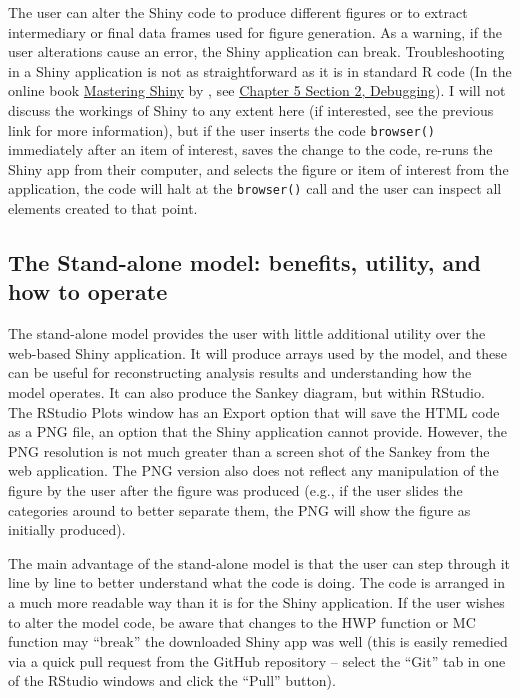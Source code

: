 \documentclass[
]{book}
\begin{document}
The user can alter the Shiny code to produce different figures or to extract intermediary or final data frames used for figure generation. As a warning, if the user alterations cause an error, the Shiny application can break. Troubleshooting in a Shiny application is not as straightforward as it is in standard R code (In the online book \href{https://mastering-shiny.org/index.html}{Mastering Shiny} by \citet{wickham2021}, see \href{https://mastering-shiny.org/action-workflow.html}{Chapter 5 Section 2, Debugging}). I will not discuss the workings of Shiny to any extent here (if interested, see the previous link for more information), but if the user inserts the code \texttt{browser()} immediately after an item of interest, saves the change to the code, re-runs the Shiny app from their computer, and selects the figure or item of interest from the application, the code will halt at the \texttt{browser()} call and the user can inspect all elements created to that point.

\hypertarget{run-opp-sa}{%
\subsection{The Stand-alone model: benefits, utility, and how to operate}\label{run-opp-sa}}

The stand-alone model provides the user with little additional utility over the web-based Shiny application. It will produce arrays used by the model, and these can be useful for reconstructing analysis results and understanding how the model operates. It can also produce the Sankey diagram, but within RStudio. The RStudio Plots window has an Export option that will save the HTML code as a PNG file, an option that the Shiny application cannot provide. However, the PNG resolution is not much greater than a screen shot of the Sankey from the web application. The PNG version also does not reflect any manipulation of the figure by the user after the figure was produced (e.g., if the user slides the categories around to better separate them, the PNG will show the figure as initially produced).

The main advantage of the stand-alone model is that the user can step through it line by line to better understand what the code is doing. The code is arranged in a much more readable way than it is for the Shiny application. If the user wishes to alter the model code, be aware that changes to the HWP function or MC function may ``break'' the downloaded Shiny app was well (this is easily remedied via a quick pull request from the GitHub repository -- select the ``Git'' tab in one of the RStudio windows and click the ``Pull'' button).
\end{document}
